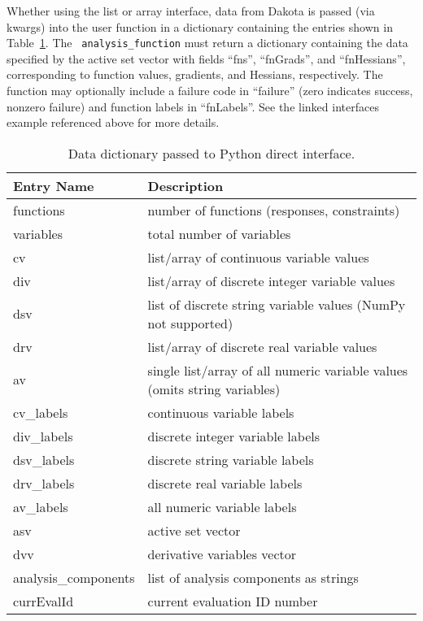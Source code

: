 Whether using the list or array interface, data from Dakota is passed
(via kwargs) into the user function in a dictionary containing the
entries shown in Table~\ref{advint:table:pythonparams}. The {\tt
analysis\_function} must return a dictionary containing the data
specified by the active set vector with fields ``fns'', ``fnGrads'',
and ``fnHessians'', corresponding to function values, gradients, and
Hessians, respectively. The function may optionally include a failure
code in ``failure'' (zero indicates success, nonzero failure) and
function labels in ``fnLabels''. See the linked interfaces example
referenced above for more details.

\begin{table}
\centering
\caption{Data dictionary passed to Python direct interface.}
\label{advint:table:pythonparams}\vspace{2mm}
\begin{tabular}{|l|l|}
\hline
\textbf{Entry Name} & \textbf{Description}  \\
\hline
functions  & number of functions (responses, constraints) \\
variables  & total number of variables \\
cv         & list/array of continuous variable values \\
div        & list/array of discrete integer variable values \\
dsv        & list of discrete string variable values (NumPy not supported)\\
drv        & list/array of discrete real variable values \\
av         & single list/array of all numeric variable values (omits string variables) \\
cv\_labels  & continuous variable labels \\
div\_labels & discrete integer variable labels \\
dsv\_labels & discrete string variable labels \\
drv\_labels & discrete real variable labels \\
av\_labels  & all numeric variable labels \\
asv        & active set vector \\
dvv        & derivative variables vector \\
analysis\_components & list of analysis components as strings \\
currEvalId & current evaluation ID number \\
\hline
\end{tabular}
\end{table}

